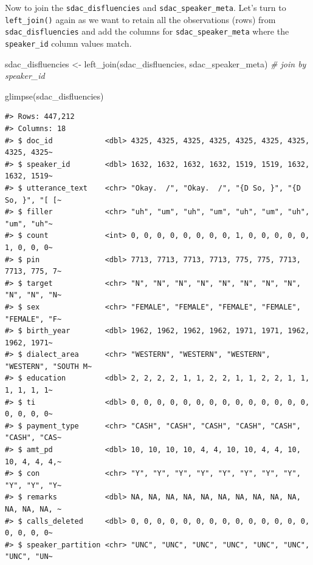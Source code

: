 \documentclass[
  letterpaper,
]{latex/krantz}
\newenvironment{Shaded}{\begin{snugshade}}{\end{snugshade}}
\newcommand{\CommentTok}[1]{\textcolor[rgb]{0.00,0.00,0.00}{\textit{#1}}}
\newcommand{\FunctionTok}[1]{\textcolor[rgb]{0.00,0.00,0.00}{#1}}
\newcommand{\NormalTok}[1]{\textcolor[rgb]{0.00,0.00,0.00}{#1}}
\newcommand{\OtherTok}[1]{\textcolor[rgb]{0.00,0.00,0.00}{#1}}
\begin{document}
Now to join the \texttt{sdac\_disfluencies} and
\texttt{sdac\_speaker\_meta}. Let's turn to \texttt{left\_join()} again
as we want to retain all the observations (rows) from
\texttt{sdac\_disfluencies} and add the columns for
\texttt{sdac\_speaker\_meta} where the \texttt{speaker\_id} column
values match.

\begin{Shaded}
\begin{Highlighting}[]
\NormalTok{sdac\_disfluencies }\OtherTok{\textless{}{-}} 
  \FunctionTok{left\_join}\NormalTok{(sdac\_disfluencies, sdac\_speaker\_meta) }\CommentTok{\# join by \textasciigrave{}\textasciigrave{}speaker\_id\textasciigrave{}}

\FunctionTok{glimpse}\NormalTok{(sdac\_disfluencies)}
\end{Highlighting}
\end{Shaded}

\begin{verbatim}
#> Rows: 447,212
#> Columns: 18
#> $ doc_id            <dbl> 4325, 4325, 4325, 4325, 4325, 4325, 4325, 4325, 4325~
#> $ speaker_id        <dbl> 1632, 1632, 1632, 1632, 1519, 1519, 1632, 1632, 1519~
#> $ utterance_text    <chr> "Okay.  /", "Okay.  /", "{D So, }", "{D So, }", "[ [~
#> $ filler            <chr> "uh", "um", "uh", "um", "uh", "um", "uh", "um", "uh"~
#> $ count             <int> 0, 0, 0, 0, 0, 0, 0, 0, 1, 0, 0, 0, 0, 0, 1, 0, 0, 0~
#> $ pin               <dbl> 7713, 7713, 7713, 7713, 775, 775, 7713, 7713, 775, 7~
#> $ target            <chr> "N", "N", "N", "N", "N", "N", "N", "N", "N", "N", "N~
#> $ sex               <chr> "FEMALE", "FEMALE", "FEMALE", "FEMALE", "FEMALE", "F~
#> $ birth_year        <dbl> 1962, 1962, 1962, 1962, 1971, 1971, 1962, 1962, 1971~
#> $ dialect_area      <chr> "WESTERN", "WESTERN", "WESTERN", "WESTERN", "SOUTH M~
#> $ education         <dbl> 2, 2, 2, 2, 1, 1, 2, 2, 1, 1, 2, 2, 1, 1, 1, 1, 1, 1~
#> $ ti                <dbl> 0, 0, 0, 0, 0, 0, 0, 0, 0, 0, 0, 0, 0, 0, 0, 0, 0, 0~
#> $ payment_type      <chr> "CASH", "CASH", "CASH", "CASH", "CASH", "CASH", "CAS~
#> $ amt_pd            <dbl> 10, 10, 10, 10, 4, 4, 10, 10, 4, 4, 10, 10, 4, 4, 4,~
#> $ con               <chr> "Y", "Y", "Y", "Y", "Y", "Y", "Y", "Y", "Y", "Y", "Y~
#> $ remarks           <dbl> NA, NA, NA, NA, NA, NA, NA, NA, NA, NA, NA, NA, NA, ~
#> $ calls_deleted     <dbl> 0, 0, 0, 0, 0, 0, 0, 0, 0, 0, 0, 0, 0, 0, 0, 0, 0, 0~
#> $ speaker_partition <chr> "UNC", "UNC", "UNC", "UNC", "UNC", "UNC", "UNC", "UN~
\end{verbatim}
\end{document}
